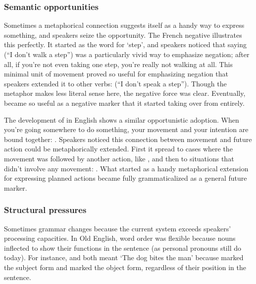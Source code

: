 \subsubsection*{Semantic opportunities}
Sometimes a metaphorical connection suggests itself as a handy way to express something, and speakers seize the opportunity. The French negative  illustrates this perfectly. It started as the word for `step', and speakers noticed that saying  (\enquote{I don't walk a step}) was a particularly vivid way to emphasize negation; after all, if you're not even taking one step, you're really not walking at all. This minimal unit of movement proved so useful for emphasizing negation that speakers extended it to other verbs:  (\enquote{I don't speak a step}). Though the metaphor makes less literal sense here, the negative force was clear. Eventually,  became so useful as a negative marker that it started taking over from  entirely.

The development of  in English shows a similar opportunistic adoption. When you're going somewhere to do something, your movement and your intention are bound together: . Speakers noticed this connection between movement and future action could be metaphorically extended. First it spread to cases where the movement was followed by another action, like , and then to situations that didn't involve any movement: . What started as a handy metaphorical extension for expressing planned actions became fully grammaticalized as a general future marker.

\subsubsection*{Structural pressures}
Sometimes grammar changes because the current system exceeds speakers' processing capacities. In Old English, word order was flexible because nouns inflected to show their functions in the sentence (as personal pronouns still do today). For instance,  and  both meant `The dog bites the man' because  marked the subject form and  marked the object form, regardless of their position in the sentence.

